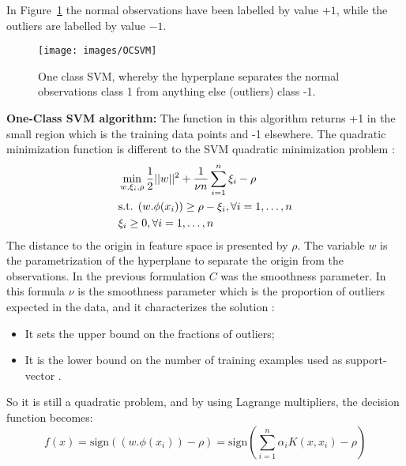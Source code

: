 In Figure~\ref{OSVM1} the normal observations have been labelled by value $+1$, while the outliers are labelled by value $-1$.

\begin{figure}[H]
\begin{center}
  \texttt{[image: images/OCSVM]}
\endminipage
\end{center}
  \caption{One class SVM, whereby the hyperplane separates the normal observations class 1 from anything else (outliers) class -1.}
  \label{OSVM1}
\end{figure}

\textbf{One-Class SVM algorithm:}
The function in this algorithm returns +1 in the small region which is the training data points and -1 elsewhere. The quadratic minimization function is different to the SVM quadratic minimization problem \citep{Scholkopf}:
\begin{align}
&\min_{w,\xi_i,\rho}{\frac{1}{2}||w||^2 + \frac{1}{\nu n} \sum_{i=1}^{n}\xi_i - \rho} \\
&\notag \text{s.t. } (w.\phi(x_i)) \geq \rho - \xi_i, \forall i=1,\ldots,n \\ 
&\notag \xi_i \geq 0, \forall i=1,\ldots,n 
\end{align}
The distance to the origin in feature space is presented by $\rho$. The variable $w$ is the parametrization of the hyperplane to separate the origin from the observations. In the previous formulation $C$ was the smoothness parameter. In this formula $\nu$ is the smoothness parameter which is the proportion of outliers expected in the data, and it characterizes the solution \citep{OCSVM}:
\begin{itemize}
\item It sets the upper bound on the fractions of outliers;
\item It is the lower bound on the number of training examples used as support-vector \citep{Scholkopf}.
\end{itemize}
So it is still a quadratic problem, and by using Lagrange multipliers, the decision function becomes:
$$
f(x) = \text{sign}((w.\phi(x_i)) - \rho) = \text{sign}(\sum_{i=1}^{n} \alpha_i K(x,x_i) - \rho)
$$

